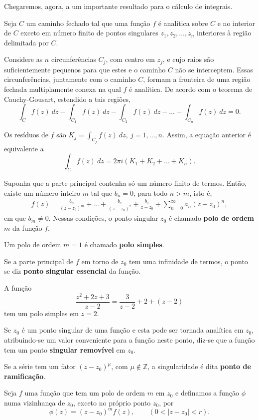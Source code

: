 Chegaremos, agora, a um importante resultado para o cálculo de integrais.

Seja $C$ um caminho fechado tal que uma função $f$ é analítica sobre $C$ e no interior de $C$ exceto em número finito de pontos singulares $z_1, z_2, \ldots, z_n$ interiores à região delimitada por $C$.

Considere as $n$ circunferências $C_j$, com centro em $z_j$, e cujo raios são suficientemente pequenos para que estes e o caminho $C$ não se interceptem. Essas circunferências, juntamente com o caminho $C$, formam a fronteira de uma região fechada multiplamente conexa na qual $f$ é analítica. De acordo com o teorema de Cauchy-Gousart, estendido a tais regiões,
$$\displaystyle\int_C f(z)~dz - \int_{C_1} f(z)~dz - \int_{C_2} f(z)~dz - \ldots - \int_{C_n} f(z)~dz = 0.$$

Os resíduos de $f$ são $K_j = \displaystyle\int_{C_j} f(z)~dz,~ j = 1, \ldots, n$. Assim, a equação anterior é equivalente a
$$\int_C f(z)~dz = 2\pi i (K_1+K_2+\ldots+K_n).$$


Suponha que a parte principal contenha só um número finito de termos. Então, existe um número inteiro $m$ tal que $b_n=0$, para todo $n>m$, isto é,
\begin{eqnarray}\label{polom}
f(z) = 
\frac{b_m}{(z-z_0)^m}
+\ldots+
\frac{b_2}{(z-z_0)^2}
+
\frac{b_1}{z-z_0}
+
\sum_{n=0}^{\infty}a_n(z-z_0)^n,
\end{eqnarray}
em que $b_m\neq0$. Nessas condições, o ponto singular $z_0$ é chamado \textbf{polo de ordem} $m$ da função $f$.

Um polo de ordem $m=1$ é chamado \textbf{polo simples}.

Se a parte principal de $f$ em torno de $z_0$ tem uma infinidade de termos, o ponto se diz \textbf{ponto singular essencial} da função.

A função
$$\dfrac{z^2+2z+3}{z-2}=\dfrac{3}{z-2}+2+(z-2)$$
tem um polo simples em $z=2$.

Se $z_0$ é um ponto singular de uma função e esta pode ser tornada analítica em $z_0$, atribuindo-se um valor conveniente para a função neste ponto, diz-se que a função tem um ponto \textbf{singular removível} em $z_0$.

Se a série tem um fator $(z-z_0)^{\mu}$, com $\mu \not\in \mathbb{Z}$, a singularidade é dita \textbf{ponto de ramificação}.

Seja $f$ uma função que tem um polo de ordem $m$ em $z_0$ e definamos a função $\phi$ numa vizinhança de $z_0$, exceto no próprio ponto $z_0$, por
$$\phi(z)=(z-z_0)^mf(z),\qquad (0<|z-z_0|<r).$$

